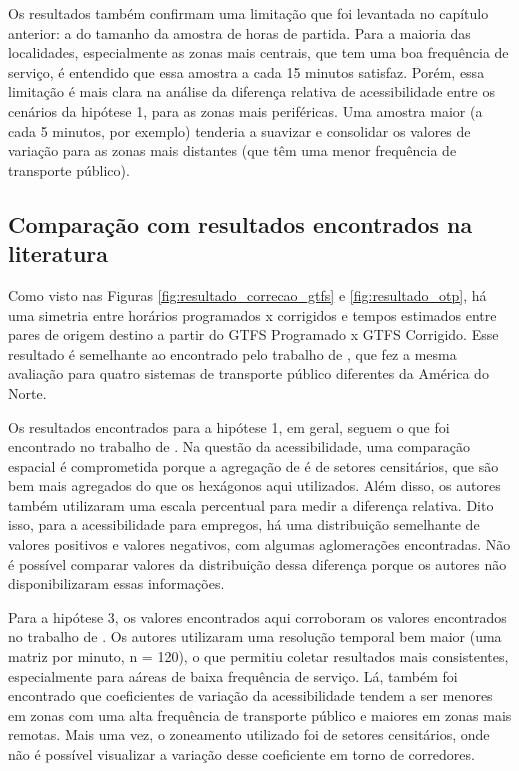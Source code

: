 \documentclass[        
    a4paper,          %
    12pt,             %
    chapter=TITLE,    %
    section=Title,    %
    subsection=Title, %
    oneside,          %
    english,          %
    spanish,          %
    brazil,           %
    fleqn             %
]{abntex2}
\begin{document}
  Os resultados também confirmam uma limitação que foi levantada no capítulo anterior: a do tamanho da amostra de horas de partida. Para a maioria das localidades, especialmente as zonas mais centrais, que tem uma boa frequência de serviço, é entendido que essa amostra a cada 15 minutos satisfaz. Porém, essa limitação é mais clara na análise da diferença relativa de acessibilidade entre os cenários da hipótese 1, para as zonas mais periféricas. Uma amostra maior (a cada 5 minutos, por exemplo) tenderia a suavizar e consolidar os valores de variação para as zonas mais distantes (que têm uma menor frequência de transporte público).
  
  \hypertarget{comparacao-com-resultados-encontrados-na-literatura}{%
  \subsection{Comparação com resultados encontrados na literatura}\label{comparacao-com-resultados-encontrados-na-literatura}}
  
  Como visto nas Figuras \ref{fig:resultado_correcao_gtfs} e \ref{fig:resultado_otp}, há uma simetria entre horários programados x corrigidos e tempos estimados entre pares de origem destino a partir do GTFS Programado x GTFS Corrigido. Esse resultado é semelhante ao encontrado pelo trabalho de \citet{Wessel2019}, que fez a mesma avaliação para quatro sistemas de transporte público diferentes da América do Norte.
  
  Os resultados encontrados para a hipótese 1, em geral, seguem o que foi encontrado no trabalho de \citet{Wessel2017}. Na questão da acessibilidade, uma comparação espacial é comprometida porque a agregação de \citet{Wessel2017} é de setores censitários, que são bem mais agregados do que os hexágonos aqui utilizados. Além disso, os autores também utilizaram uma escala percentual para medir a diferença relativa. Dito isso, para a acessibilidade para empregos, há uma distribuição semelhante de valores positivos e valores negativos, com algumas aglomerações encontradas. Não é possível comparar valores da distribuição dessa diferença porque os autores não disponibilizaram essas informações.
  
  Para a hipótese 3, os valores encontrados aqui corroboram os valores encontrados no trabalho de \citet{Owen2015}. Os autores utilizaram uma resolução temporal bem maior (uma matriz por minuto, n = 120), o que permitiu coletar resultados mais consistentes, especialmente para aáreas de baixa frequência de serviço. Lá, também foi encontrado que coeficientes de variação da acessibilidade tendem a ser menores em zonas com uma alta frequência de transporte público e maiores em zonas mais remotas. Mais uma vez, o zoneamento utilizado foi de setores censitários, onde não é possível visualizar a variação desse coeficiente em torno de corredores.
  
\end{document}
